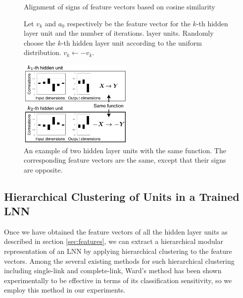 \documentclass{article}
\begin{document}
\begin{figure}[t]
\begin{minipage}{0.43\hsize}
\begin{algorithm}[H]
\caption{Alignment of signs of feature vectors based on cosine similarity}
\label{alg:alignment}
\begin{algorithmic}[1]
\STATE Let $v_k$ and $a_0$ respectively be the feature vector for the $k$-th hidden layer unit and the number of iterations. 
layer units. 
  \STATE Randomly choose the $k$-th hidden layer unit according to the uniform distribution. 
    \STATE $v_k \gets -v_k$. 
  \ENDIF
\ENDFOR
\end{algorithmic}
\end{algorithm}
\end{minipage}\hspace{0.02\hsize}
\begin{minipage}{0.55\hsize}
\centering
\includegraphics[width=55mm]{alignment.png}\vspace{-3mm}
\caption{An example of two hidden layer units with the same function. The corresponding feature vectors are the same, except that their signs are opposite. }
\label{fig:alignment}
\end{minipage}
\end{figure}

\subsection{Hierarchical Clustering of Units in a Trained LNN}

Once we have obtained the feature vectors of all the hidden layer units as described in section \ref{sec:features}, we can extract a hierarchical modular representation of an LNN by applying hierarchical clustering to the feature vectors. Among the several existing methods for such hierarchical clustering including single-link and complete-link, Ward's method\cite{Ward1963} has been shown experimentally to be effective in terms of its classification sensitivity, so we employ this method in our experiments. 
\end{document}
